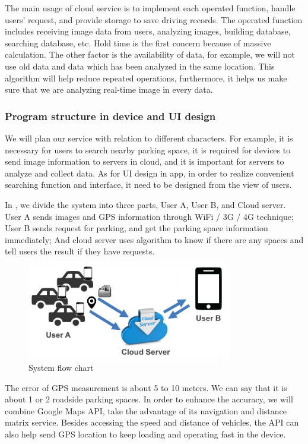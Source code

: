 \documentclass[preprint,12pt]{elsarticle}
\begin{document}
The main usage of cloud service is to implement each operated function,
handle users' request, and provide storage to save driving records. The
operated function includes receiving image data from users, analyzing
images, building database, searching database, etc. Hold time is the
first concern because of massive calculation. The other factor is the
availability of data, for example, we will not use old data and data
which has been analyzed in the same location. This algorithm will help
reduce repeated operations, furthermore, it helps us make sure that we
are analyzing real-time image in every data.

%
\subsubsection{Program structure in device and UI design}
%

We will plan our service with relation to different characters. For
example, it is necessary for users to search nearby parking space, it is
required for devices to send image information to servers in cloud, and it
is important for servers to analyze and collect data. As for UI design
in app, in order to realize convenient searching function and interface,
it need to be designed from the view of users.

In , we divide the system into three parts, User A, User B, and Cloud server.
User A sends images and GPS information through WiFi / 3G / 4G technique;
User B sends request for parking, and get the parking space information
immediately; And cloud server uses algorithm to know if there are any
spaces and tell users the result if they have requests.

\begin{figure}[tbp]
	\centering
		\includegraphics[width=0.8\textwidth,natwidth=1053,natheight=482]{Figures/flowChart.png}
		\caption{System flow chart}
		\label{fig:system}
\end{figure}

The error of GPS measurement is about 5 to 10 meters. We can say
that it is about 1 or 2 roadside parking spaces. In order to enhance the
accuracy, we will combine Google Maps API, take the advantage of its
navigation and distance matrix service. Besides accessing the speed and
distance of vehicles, the API can also help send GPS location to keep
loading and operating fast in the device.
\end{document}
